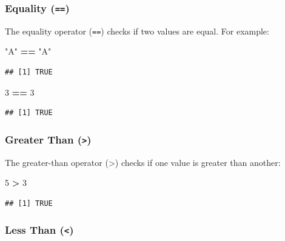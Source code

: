\documentclass[
]{book}
\newenvironment{Shaded}{\begin{snugshade}}{\end{snugshade}}
\newcommand{\DecValTok}[1]{\textcolor[rgb]{0.00,0.00,0.81}{#1}}
\newcommand{\SpecialCharTok}[1]{\textcolor[rgb]{0.81,0.36,0.00}{\textbf{#1}}}
\newcommand{\StringTok}[1]{\textcolor[rgb]{0.31,0.60,0.02}{#1}}
\begin{document}
\hypertarget{equality}{%
\subsubsection{\texorpdfstring{Equality (\texttt{==})}{Equality (==)}}\label{equality}}

The equality operator (\texttt{==}) checks if two values are equal. For example:

\begin{Shaded}
\begin{Highlighting}[]
\StringTok{"A"} \SpecialCharTok{==} \StringTok{"A"}
\end{Highlighting}
\end{Shaded}

\begin{verbatim}
## [1] TRUE
\end{verbatim}

\begin{Shaded}
\begin{Highlighting}[]
\DecValTok{3} \SpecialCharTok{==} \DecValTok{3}
\end{Highlighting}
\end{Shaded}

\begin{verbatim}
## [1] TRUE
\end{verbatim}

\hypertarget{greater-than}{%
\subsubsection{\texorpdfstring{Greater Than (\texttt{\textgreater{}})}{Greater Than (\textgreater)}}\label{greater-than}}

The greater-than operator (\textgreater) checks if one value is greater than another:

\begin{Shaded}
\begin{Highlighting}[]
\DecValTok{5} \SpecialCharTok{\textgreater{}} \DecValTok{3}
\end{Highlighting}
\end{Shaded}

\begin{verbatim}
## [1] TRUE
\end{verbatim}

\hypertarget{less-than}{%
\subsubsection{\texorpdfstring{Less Than (\texttt{\textless{}})}{Less Than (\textless)}}\label{less-than}}
\end{document}
